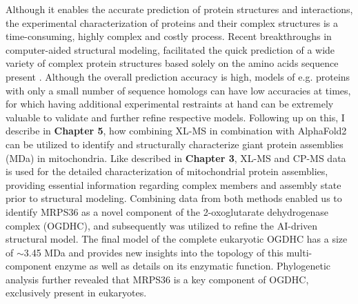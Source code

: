 Although it enables the accurate prediction of protein structures and interactions, the experimental characterization of proteins and their complex structures is a time-consuming, highly complex and costly process. Recent breakthroughs in computer-aided structural modeling, facilitated the quick prediction of a wide variety of complex protein structures based solely on the amino acids sequence present \cite{RN5, RN4}. Although the overall prediction accuracy is high, models of e.g. proteins with only a small number of sequence homologs can have low accuracies at times, for which having additional experimental restraints at hand can be extremely valuable to validate and further refine respective models. Following up on this, I describe in \textbf{Chapter 5}, how combining XL-MS in combination with AlphaFold2 \cite{RN4} can be utilized to identify and structurally characterize giant protein assemblies (MDa) in mitochondria. Like described in \textbf{Chapter 3}, XL-MS and CP-MS data is used for the detailed characterization of mitochondrial protein assemblies, providing essential information regarding complex members and assembly state prior to structural modeling. Combining data from both methods enabled us to identify MRPS36 as a novel component of the 2-oxoglutarate dehydrogenase complex (OGDHC), and subsequently was utilized to refine the AI-driven structural model. The final model of the complete eukaryotic OGDHC has a size of $\sim$3.45 MDa and provides new insights into the topology of this multi-component enzyme as well as details on its enzymatic function. Phylogenetic analysis further revealed that MRPS36 is a key component of OGDHC, exclusively present in eukaryotes.
%
